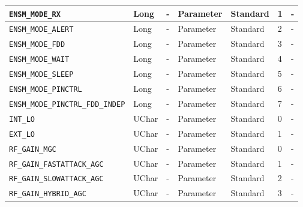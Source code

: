 \documentclass{article}
\begin{document}
\begin{landscape}
\begin{scriptsize}
\begin{longtable}{|p{3.6cm}|p{8.1cm}|p{1.4cm}|p{1.3cm}|p{1.4cm}|p{2.5cm}|p{3.6cm}|}
			\hline
      \verb+ENSM_MODE_RX+              & Long         & -               & Parameter             & Standard                         & 1                   & - \\
			\hline
      \verb+ENSM_MODE_ALERT+           & Long         & -               & Parameter             & Standard                         & 2                   & - \\
			\hline
      \verb+ENSM_MODE_FDD+             & Long         & -               & Parameter             & Standard                         & 3                   & - \\
			\hline
      \verb+ENSM_MODE_WAIT+            & Long         & -               & Parameter             & Standard                         & 4                   & - \\
			\hline
      \verb+ENSM_MODE_SLEEP+           & Long         & -               & Parameter             & Standard                         & 5                   & - \\
			\hline
      \verb+ENSM_MODE_PINCTRL+         & Long         & -               & Parameter             & Standard                         & 6                   & - \\
			\hline
      \verb+ENSM_MODE_PINCTRL_FDD_INDEP+&Long         & -               & Parameter             & Standard                         & 7                   & - \\
			\hline
      \verb+INT_LO+                    & UChar        & -               & Parameter             & Standard                         & 0                   & - \\
			\hline
      \verb+EXT_LO+                    & UChar        & -               & Parameter             & Standard                         & 1                   & - \\
			\hline
      \verb+RF_GAIN_MGC+               & UChar        & -               & Parameter             & Standard                         & 0                   & - \\
			\hline
      \verb+RF_GAIN_FASTATTACK_AGC+    & UChar        & -               & Parameter             & Standard                         & 1                   & - \\
			\hline
      \verb+RF_GAIN_SLOWATTACK_AGC+    & UChar        & -               & Parameter             & Standard                         & 2                   & - \\
			\hline
      \verb+RF_GAIN_HYBRID_AGC+        & UChar        & -               & Parameter             & Standard                         & 3                   & - \\

\end{longtable}
\end{scriptsize}
\end{landscape}
\end{document}
